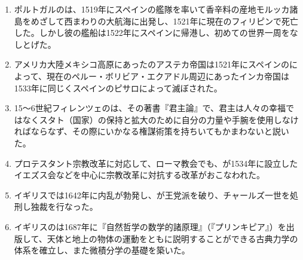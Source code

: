 \documentclass[uplatex,dvipdfmx]{jsarticle}
\newcounter{qnumber}\setcounter{qnumber}{1}
\def\anaume{\hspace{.5zw}\framebox[1.5cm]{\bf \theqnumber}\hspace{.5zw}\stepcounter{qnumber}}
\begin{document}
\begin{enumerate}


  

\item ポルトガルのは、1519年にスペインの艦隊を率いて香辛料の産地モルッカ諸島をめざして西まわりの大航海に出発し、1521年に現在のフィリピンで死亡した。しかし彼の艦船は1522年にスペインに帰港し、初めての世界一周をなしとげた。

  
\item  アメリカ大陸メキシコ高原にあったのアステカ帝国は1521年にスペインのによって、現在のペルー・ボリビア・エクアドル周辺にあったインカ帝国は1533年に同じくスペインのピサロによって滅ぼされた。

\item 15〜6世紀フィレンツェのは、その著書『君主論』で、君主は人々の幸福ではなくスタト（国家）の保持と拡大のために自分の力量や手腕を使用しなければならなず、その際にいかなる権謀術策を持ちいてもかまわないと説いた。




  
\item  プロテスタント宗教改革に対応して、ローマ教会でも、が1534年に設立したイエズス会などを中心に宗教改革に対抗する改革がおこなわれた。

\item イギリスでは1642年に内乱が勃発し、が王党派を破り、チャールズ一世を処刑し独裁を行なった。
  
\item イギリスのは1687年に『自然哲学の数学的諸原理』（『プリンキピア』）を出版して、天体と地上の物体の運動をともに説明することができる古典力学の体系を確立し、また微積分学の基礎を築いた。
  
\end{enumerate}
\end{document}
